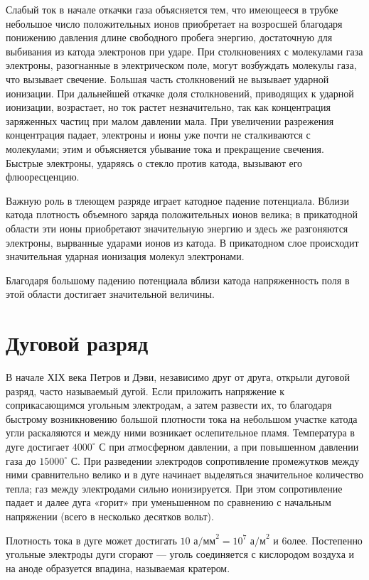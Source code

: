 \documentclass[a4paper,10pt]{book}
\begin{document}
Слабый ток в начале откачки газа объясняется тем, что имеющееся в трубке небольшое число положительных ионов приобретает на возросшей благодаря понижению давления длине свободного пробега энергию, достаточную для выбивания из катода электронов при ударе. При столкновениях с молекулами газа электроны, разогнанные в электрическом поле, могут возбуждать молекулы газа, что вызывает свечение. Большая часть столкновений не вызывает ударной ионизации. При дальнейшей откачке доля столкновений, приводящих к ударной ионизации, возрастает, но ток растет незначительно, так как концентрация заряженных частиц при малом давлении мала. При увеличении разрежения концентрация падает, электроны и ионы уже почти не сталкиваются с молекулами; этим и объясняется убывание тока и прекращение свечения. Быстрые электроны, ударяясь о стекло против катода, вызывают его флюоресценцию.

Важную роль в тлеющем разряде играет катодное падение потенциала. Вблизи катода плотность объемного заряда положительных ионов велика; в прикатодной области эти ионы приобретают значительную энергию и здесь же разгоняются электроны, вырванные ударами ионов из катода. В прикатодном слое происходит значительная ударная ионизация молекул электронами.

Благодаря большому падению потенциала вблизи катода напряженность поля в этой области достигает значительной величины.

\section{Дуговой разряд}

В начале ХIХ века Петров и Дэви, независимо друг от друга, открыли дуговой разряд, часто называемый дугой. Если приложить напряжение к соприкасающимся угольным электродам, а затем развести их, то благодаря быстрому возникновению большой плотности тока на небольшом участке катода угли раскаляются и между ними возникает ослепительное пламя. Температура в дуге достигает $4000^{\circ}$ С при атмосферном давлении, а при повышенном давлении газа до $15 000^{\circ}$ С. При разведении электродов сопротивление промежутков между ними сравнительно велико и в дуге начинает выделяться значительное количество тепла; газ между электродами сильно ионизируется. При этом сопротивление падает и далее дуга «горит» при уменьшенном по сравнению с начальным напряжении (всего в несколько десятков вольт).

Плотность тока в дуге может достигать $10\textit{ а/мм}^2 = 10^7\textit{ а/м}^2$ и 6олее. Постепенно угольные электроды дуги сгорают — уголь соединяется с кислородом воздуха и на аноде образуется впадина, называемая кратером.
\end{document}
